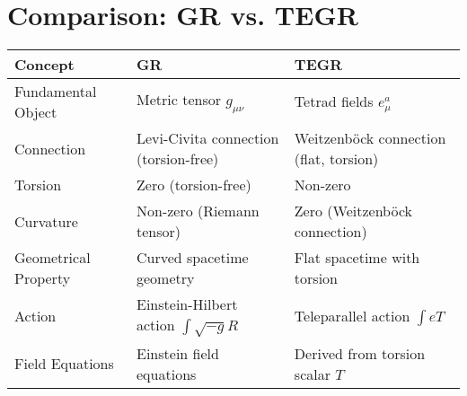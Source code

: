 \documentclass{article}
\begin{document}
\section*{Comparison: GR vs. TEGR}

\begin{tabular}{|l|l|l|}
\hline
\textbf{Concept} & \textbf{GR} & \textbf{TEGR} \\
\hline
Fundamental Object & Metric tensor $g_{\mu\nu}$ & Tetrad fields $e^a_\mu$ \\
Connection & Levi-Civita connection (torsion-free) & Weitzenböck connection (flat, torsion) \\
Torsion & Zero (torsion-free) & Non-zero \\
Curvature & Non-zero (Riemann tensor) & Zero (Weitzenböck connection) \\
Geometrical Property & Curved spacetime geometry & Flat spacetime with torsion \\
Action & Einstein-Hilbert action $\int \sqrt{-g} R$ & Teleparallel action $\int e T$ \\
Field Equations & Einstein field equations & Derived from torsion scalar $T$ \\
\hline
\end{tabular}
\end{document}
